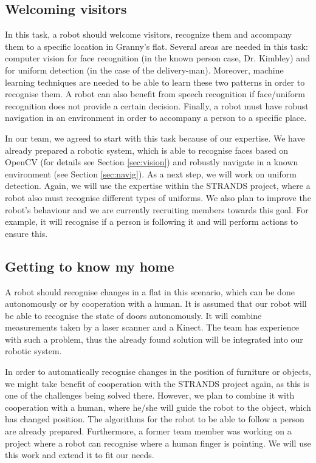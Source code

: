 \documentclass[conference]{IEEEtran}
\begin{document}
\subsection{Welcoming visitors}

In this task, a robot should welcome visitors, recognize them and accompany them to a specific location in Granny's flat. Several areas are needed in this task: computer vision for face recognition (in the known person case, Dr. Kimbley) and for uniform detection (in the case of the delivery-man). Moreover, machine learning techniques are needed to be able to learn these two patterns in order to recognise them. A robot can also benefit from speech recognition if face/uniform recognition does not provide a certain decision. Finally, a robot must have robust navigation in an environment in order to accompany a person to a specific place. 

In our team, we agreed to start with this task because of our expertise. We have already prepared a robotic system, which is able to recognise faces based on OpenCV (for details see Section \ref{sec:vision}) and robustly navigate in a known environment (see Section \ref{sec:navig}). As a next step, we will work on uniform detection. Again, we will use the expertise within the STRANDS project, where a robot also must recognise different types of uniforms. We also plan to improve the robot's behaviour and we are currently recruiting members towards this goal. For example, it will recognise if a person is following it and will perform actions to ensure this.

\subsection{Getting to know my home}

A robot should recognise changes in a flat in this scenario, which can be done autonomously or by cooperation with a human. It is assumed that our robot will be able to recognise the state of doors autonomously. It will combine measurements taken by a laser scanner and a Kinect. The team has experience with such a problem, thus the already found solution will be integrated into our robotic system. 

In order to automatically recognise changes in the position of furniture or objects, we might take benefit of cooperation with the STRANDS project again, as this is one of the challenges being solved there. However, we plan to combine it with cooperation with a human, where he/she will guide the robot to the object, which has changed position. The algorithms for the robot to be able to follow a person are already prepared. Furthermore, a former team member was working on a project where a robot can recognise where a human finger is pointing. We will use this work and extend it to fit our needs.
\end{document}
